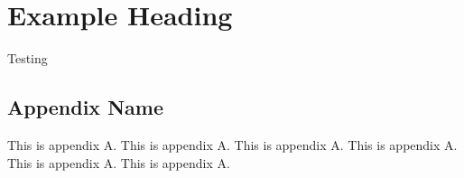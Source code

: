 \documentclass[a4paper,11pt]{report}
\begin{document}
\chapter{Example Heading}
\label{sec:orgbd38bef}
Testing \autocite{example_citation}


\printbibliography


\begin{appendices}
\chapter{Appendix Name}
\label{sec:org0dc185f}
This is appendix A.
This is appendix A.
This is appendix A.
This is appendix A.
This is appendix A.
This is appendix A.
\end{appendices}
\end{document}
